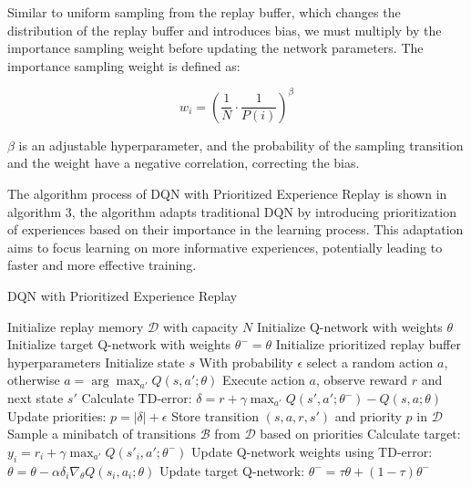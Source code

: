 \documentclass{article}
\begin{document}
Similar to uniform sampling from the replay buffer, which changes the distribution of the replay buffer and introduces bias, we must multiply by the importance sampling weight before updating the network parameters. The importance sampling weight is defined as:

\begin{equation}
w_i=\left(\frac{1}{N} \cdot \frac{1}{P(i)}\right)^\beta
\end{equation}

$\beta$ is an adjustable hyperparameter, and the probability of the sampling transition and the weight have a negative correlation, correcting the bias.

The algorithm process of DQN with Prioritized Experience Replay is shown in algorithm 3, the algorithm adapts traditional DQN by introducing prioritization of experiences based on their importance in the learning process. This adaptation aims to focus learning on more informative experiences, potentially leading to faster and more effective training.

\begin{algorithm}
  \caption{DQN with Prioritized Experience Replay}
  \begin{algorithmic}[1]
    \State Initialize replay memory $\mathcal{D}$ with capacity $N$
    \State Initialize Q-network with weights $\theta$
    \State Initialize target Q-network with weights $\theta^{-} = \theta$
    \State Initialize prioritized replay buffer hyperparameters
      \State Initialize state $s$
        \State With probability $\epsilon$ select a random action $a$, otherwise $a = \arg\max_{a'} Q(s, a'; \theta)$
        \State Execute action $a$, observe reward $r$ and next state $s'$
        \State Calculate TD-error: $\delta = r + \gamma \max_{a'} Q(s', a'; \theta^{-}) - Q(s, a; \theta)$
        \State Update priorities: $p = |\delta| + \epsilon$
        \State Store transition $(s, a, r, s')$ and priority $p$ in $\mathcal{D}$
        \State Sample a minibatch of transitions $\mathcal{B}$ from $\mathcal{D}$ based on priorities
          \State Calculate target: $y_i = r_i + \gamma \max_{a'} Q(s'_i, a'; \theta^{-})$
          \State Update Q-network weights using TD-error: $\theta = \theta - \alpha \delta_i \nabla_\theta Q(s_i, a_i; \theta)$
        \EndFor
        \State Update target Q-network: $\theta^{-} = \tau \theta + (1 - \tau) \theta^{-}$
      \EndFor
    \EndFor
  \end{algorithmic}
\end{algorithm}
\end{document}
